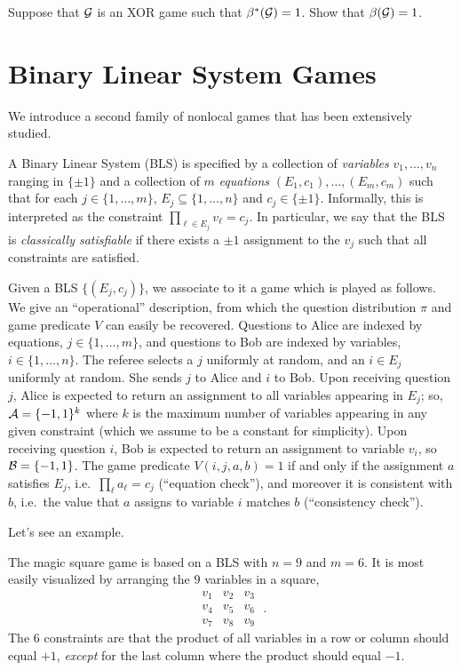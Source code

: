 \begin{exercise}
Suppose that $\mathcal{G}$ is an XOR game such that $\beta^*(\mathcal{G})=1$. Show that $\beta(\mathcal{G})=1$. 
\end{exercise}

\section{Binary Linear System Games}

We introduce a second family of nonlocal games that has been extensively studied. 

A Binary Linear System (BLS) is specified by a collection of \emph{variables} $v_1,\ldots,v_n$ ranging in $\{\pm 1\}$ and a collection of $m$ \emph{equations} $(E_1,c_1),\ldots,(E_m,c_m)$ such that for each $j\in\{1,\ldots,m\}$, $E_j \subseteq \{1,\ldots,n\}$ and $c_j\in\{\pm 1\}$. Informally, this is interpreted as the constraint $\prod_{\ell\in E_j} v_\ell = c_j$. In particular, we say that the BLS is \emph{classically satisfiable} if there exists a $\pm1$ assignment to the $v_j$ such that all constraints are satisfied. 

Given a BLS $\{(E_j,c_j)\}$, we associate to it a game which is played as follows. We give an ``operational'' description, from which the question distribution $\pi$ and game predicate $V$ can easily be recovered. Questions to Alice are indexed by equations, $j\in \{1,\ldots,m\}$, and questions to Bob are indexed by variables, $i\in \{1,\ldots,n\}$. The referee selects a $j$ uniformly at random, and an $i\in E_j$ uniformly at random. She sends $j$ to Alice and $i$ to Bob. 
Upon receiving question $j$, Alice is expected to return an assignment to all variables appearing in $E_j$; so, $\mathcal{A}=\{-1,1\}^k$ where $k$ is the maximum number of variables appearing in any given constraint (which we  assume to be a constant for simplicity). Upon receiving question $i$, Bob  is expected to return an assignment to variable $v_i$, so $\mathcal{B}=\{-1,1\}$.  The game predicate $V(i,j,a,b)=1$ if and only if the assignment $a$ satisfies $E_j$, i.e.\ $\prod_\ell a_\ell = c_j$ (``equation check''), and moreover it is consistent with $b$, i.e.\ the value that $a$ assigns to variable $i$ matches $b$ (``consistency check''). 


Let's see an example. 

\begin{example}
The magic square game is based on a BLS with $n=9$ and $m=6$. It is most easily visualized by arranging the $9$ variables in a square, 
\[\begin{matrix} v_1 & v_2 & v_3 \\ v_4 & v_5 & v_6 \\ v_7 & v_8 & v_9 \end{matrix}\;.\]
The $6$ constraints are that the product of all variables in a row or column should equal $+1$, \emph{except} for the last column where the product should equal $-1$.
\end{example}

